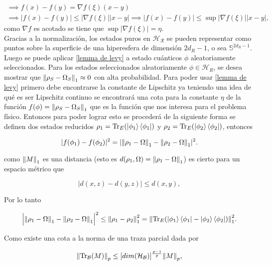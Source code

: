 \begin{multline}
\implies f(x)-f(y)= \nabla f(\xi) (x-y) \\
\implies |f(x)- f(y)| \le |\nabla f(\xi)| |x-y| 
\implies |f(x)- f(y)| \le \sup|\nabla f(\xi)| |x-y|,
\end{multline}
como $\nabla f$ es acotado se tiene que $\sup |\nabla f(\xi)|=\eta$.\\

Gracias a la normalización, los estados puros en $\mathcal{H_{R}}$ se pueden representar como puntos sobre la superficie de una hiperesfera de dimensión $2d_{R}-1$, o sea  $\mathbb{S}^{2d_{R}-1}$. Luego se puede aplicar \ref{lemma de levy} a estado cuánticos $\phi$ aleatoriamente seleccionados. Para los estados seleccionados aleatoriamente $\phi \in \mathcal{H}_{R}$, se desea mostrar que $\norm{\rho_{S}- \Omega_{S}}_{1} \approx 0$ con alta probabilidad. Para poder usar \ref{lemma de levy} primero  debe encontrarse la constante de Lipschitz ya teniendo una idea de qué es ser Lipschitz continuo se encontrará una cota para la constante $\eta$ de la función $f(\phi)=\norm{\rho_{S}-\Omega_{S}}_{1}$ que es la función que nos interesa para el problema físico. Entonces para poder lograr esto se procederá de la siguiente forma se definen dos estados reducidos $\rho_{1}= \Tr_{E} (\ket{\phi_{1}} \bra{\phi_{1}})$ y $\rho_{2}= \Tr_{E}(\ket{\phi_{2}} \bra{\phi_{2}})$, entonces

\begin{equation}
|f(\phi_{1})-f(\phi_{2})|^2= |\norm{\rho_{1}-\Omega}_{1} - \norm{\rho_{2}-\Omega}_{1}|^2.
\end{equation}

como $\norm{M}_{1}$ es una distancia (esto es $d(\rho_{1},\Omega)= \norm{\rho_{1}-\Omega}_{1}$) es cierto para un espacio métrico que

\begin{equation}
|d(x,z)-d(y,z)| \le d(x,y),
\end{equation}

Por lo tanto 

\begin{equation}
\Big | \norm{\rho_{1}-\Omega}_{1} - \norm{\rho_{2}-\Omega}_{1} \Big |^2 \le \norm{\rho_{1}- \rho_{2} }_{1}^2= \norm{\Tr_{E}(\ket{\phi_{1}} \bra{\phi_{1}}-\ket{\phi_{2}} \bra{\phi_{2}})}_{1}^{2}.
\end{equation}

Como existe una cota a la norma de una traza parcial dada por

\begin{equation}
\norm{\Tr_{\mathcal{B}}(M)}_{p} \le [dim(\mathcal{H_{B}})]^{\frac{p-1}{p}} \norm{M}_{p},
\end{equation}

